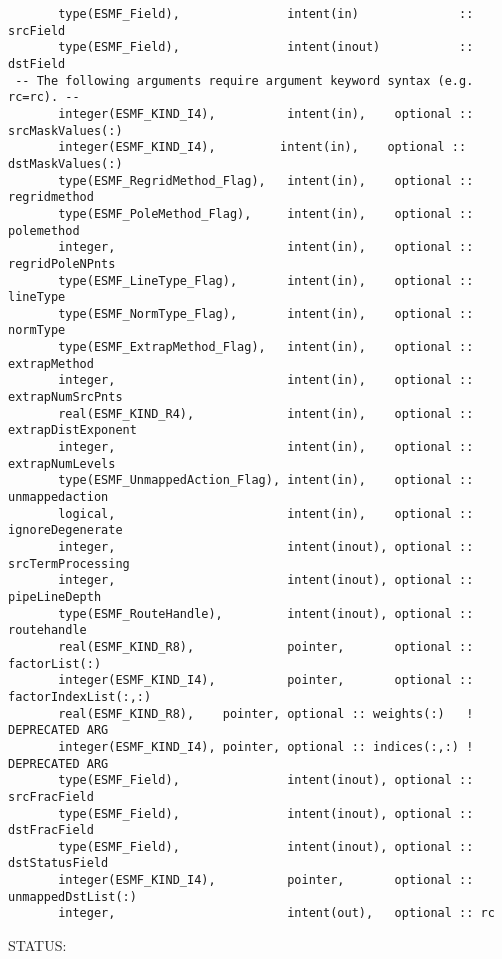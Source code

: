 \begin{verbatim}       type(ESMF_Field),               intent(in)              :: srcField
       type(ESMF_Field),               intent(inout)           :: dstField
 -- The following arguments require argument keyword syntax (e.g. rc=rc). --
       integer(ESMF_KIND_I4),          intent(in),    optional :: srcMaskValues(:)
       integer(ESMF_KIND_I4),         intent(in),    optional :: dstMaskValues(:)
       type(ESMF_RegridMethod_Flag),   intent(in),    optional :: regridmethod
       type(ESMF_PoleMethod_Flag),     intent(in),    optional :: polemethod
       integer,                        intent(in),    optional :: regridPoleNPnts
       type(ESMF_LineType_Flag),       intent(in),    optional :: lineType
       type(ESMF_NormType_Flag),       intent(in),    optional :: normType
       type(ESMF_ExtrapMethod_Flag),   intent(in),    optional :: extrapMethod
       integer,                        intent(in),    optional :: extrapNumSrcPnts
       real(ESMF_KIND_R4),             intent(in),    optional :: extrapDistExponent
       integer,                        intent(in),    optional :: extrapNumLevels
       type(ESMF_UnmappedAction_Flag), intent(in),    optional :: unmappedaction
       logical,                        intent(in),    optional :: ignoreDegenerate
       integer,                        intent(inout), optional :: srcTermProcessing
       integer,                        intent(inout), optional :: pipeLineDepth
       type(ESMF_RouteHandle),         intent(inout), optional :: routehandle
       real(ESMF_KIND_R8),             pointer,       optional :: factorList(:)
       integer(ESMF_KIND_I4),          pointer,       optional :: factorIndexList(:,:)
       real(ESMF_KIND_R8),    pointer, optional :: weights(:)   ! DEPRECATED ARG
       integer(ESMF_KIND_I4), pointer, optional :: indices(:,:) ! DEPRECATED ARG
       type(ESMF_Field),               intent(inout), optional :: srcFracField
       type(ESMF_Field),               intent(inout), optional :: dstFracField
       type(ESMF_Field),               intent(inout), optional :: dstStatusField
       integer(ESMF_KIND_I4),          pointer,       optional :: unmappedDstList(:)
       integer,                        intent(out),   optional :: rc \end{verbatim}
{\sf STATUS:}
